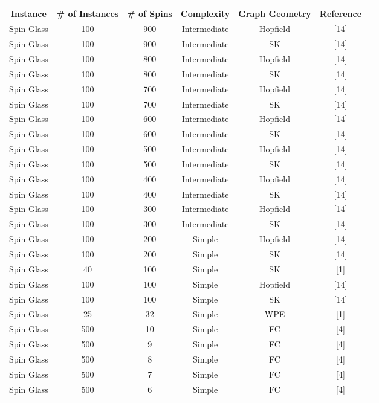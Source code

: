 \documentclass{standalone}
\begin{document}
\begin{tabular}{ |c|c|c|c|c|c|c| } 
    \hline
    \textbf{Instance} & \textbf{\# of Instances} & \textbf{\# of Spins} & \textbf{Complexity} & \textbf{Graph Geometry} & \textbf{Reference}\\ 
    \hline
    Spin Glass & 100 & 900 & Intermediate & Hopfield & [14] \\
    Spin Glass & 100 & 900 & Intermediate & SK & [14] \\
    Spin Glass & 100 & 800 & Intermediate & Hopfield & [14] \\
    Spin Glass & 100 & 800 & Intermediate & SK & [14] \\
    Spin Glass & 100 & 700 & Intermediate & Hopfield & [14] \\
    Spin Glass & 100 & 700 & Intermediate & SK & [14] \\
    Spin Glass & 100 & 600 & Intermediate & Hopfield & [14] \\
    Spin Glass & 100 & 600 & Intermediate & SK & [14] \\
    Spin Glass & 100 & 500 & Intermediate & Hopfield & [14] \\
    Spin Glass & 100 & 500 & Intermediate & SK & [14] \\
    Spin Glass & 100 & 400 & Intermediate & Hopfield & [14] \\
    Spin Glass & 100 & 400 & Intermediate & SK & [14] \\
    Spin Glass & 100 & 300 & Intermediate & Hopfield & [14] \\
    Spin Glass & 100 & 300 & Intermediate & SK & [14] \\
    Spin Glass & 100 & 200 & Simple & Hopfield & [14] \\
    Spin Glass & 100 & 200 & Simple & SK & [14] \\
    Spin Glass & 40 & 100 & Simple & SK & [1] \\
    Spin Glass & 100 & 100 & Simple & Hopfield & [14] \\
    Spin Glass & 100 & 100 & Simple & SK & [14] \\
    Spin Glass & 25 & 32 & Simple & WPE & [1] \\
    Spin Glass & 500 & 10 & Simple & FC & [4] \\
    Spin Glass & 500 & 9 & Simple & FC & [4] \\
    Spin Glass & 500 & 8 & Simple & FC & [4] \\
    Spin Glass & 500 & 7 & Simple & FC & [4] \\
    Spin Glass & 500 & 6 & Simple & FC & [4] \\

\end{tabular}
\end{document}
